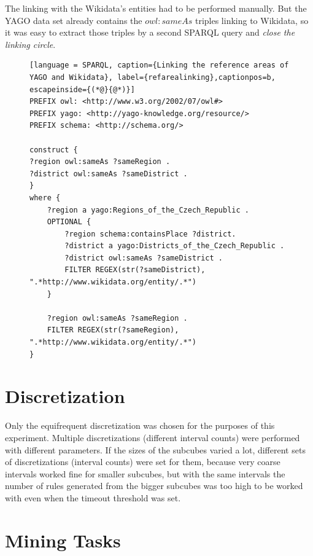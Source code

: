 The linking with the Wikidata's entities had to be performed manually. But the YAGO data set already contains the $owl:sameAs$ triples linking to Wikidata, so it was easy to extract those triples by a second SPARQL query and \textit{close the linking circle}.

\begin{figure}[h]
\begin{lstlisting}[language = SPARQL, caption={Linking the reference areas of YAGO and Wikidata}, label={refarealinking},captionpos=b, escapeinside={(*@}{@*)}]
PREFIX owl: <http://www.w3.org/2002/07/owl#>
PREFIX yago: <http://yago-knowledge.org/resource/>
PREFIX schema: <http://schema.org/>
    
construct {
?region owl:sameAs ?sameRegion .
?district owl:sameAs ?sameDistrict .
}
where {
    ?region a yago:Regions_of_the_Czech_Republic .
    OPTIONAL {
        ?region schema:containsPlace ?district.
        ?district a yago:Districts_of_the_Czech_Republic .
        ?district owl:sameAs ?sameDistrict .
        FILTER REGEX(str(?sameDistrict), ".*http://www.wikidata.org/entity/.*")
    } 
    
    ?region owl:sameAs ?sameRegion .  
    FILTER REGEX(str(?sameRegion), ".*http://www.wikidata.org/entity/.*")
}
\end{lstlisting}
\end{figure}

\section{Discretization\label{discretization}}

Only the equifrequent discretization was chosen for the purposes of this experiment. Multiple discretizations (different interval counts) were performed with different parameters. If the sizes of the subcubes varied a lot, different sets of discretizations (interval counts) were set for them, because very coarse intervals worked fine for smaller subcubes, but with the same intervals the number of rules generated from the bigger subcubes was too high to be worked with even when the timeout threshold was set.

\section{Mining Tasks}


